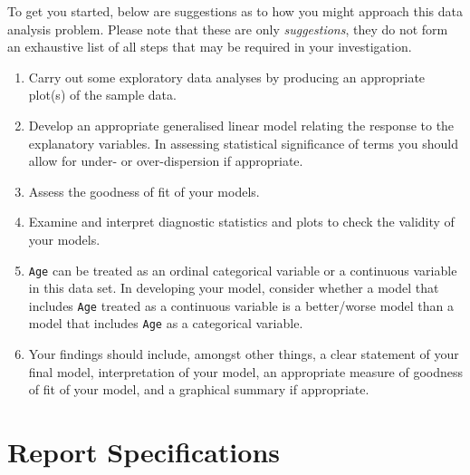 \documentclass[11pt,a4paper]{article}
\begin{document}
To get you started, below are suggestions as to how you might approach this data analysis problem.  Please note that these are only \emph{suggestions}, they do not form an exhaustive list of all steps that may be required in your investigation.

\begin{enumerate}
    \item Carry out some exploratory data analyses by producing an appropriate plot(s) of the sample data.
    \item Develop an appropriate generalised linear model relating the response to the explanatory variables.  In assessing statistical significance of terms you should allow for under- or over-dispersion if appropriate.
    \item Assess the goodness of fit of your models.
    \item Examine and interpret diagnostic statistics and plots to check the validity of your models.
    \item \texttt{Age} can be treated as an ordinal categorical variable or a continuous variable in this data set.  In developing your model, consider whether a model that includes \texttt{Age} treated as a continuous variable is a better/worse model than a model that includes \texttt{Age} as a categorical variable.
    \item Your findings should include, amongst other things, a clear statement of your final model, interpretation of your model, an appropriate measure of goodness of fit of your model, and a graphical summary if appropriate.
\end{enumerate}


\newpage
\section*{Report Specifications}
\end{document}
